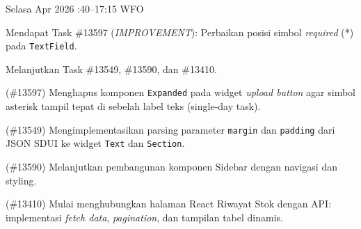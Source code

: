 \begin{logtable}
    {
        Selasa  Apr 2026 :40--17:15 \linebreak %
        WFO
    }{
        \begin{loglist}
            \item Mendapat Task \#13597 (\textit{IMPROVEMENT}): Perbaikan posisi simbol
            \textit{required} (*) pada \texttt{TextField}.
            \item Melanjutkan Task \#13549, \#13590, dan \#13410.
        \end{loglist}
    }{
        \begin{logwork}
            \item (\#13597) Menghapus komponen \texttt{Expanded} pada widget \textit{upload button} agar simbol asterisk tampil tepat di sebelah label teks (single-day task).
            \item (\#13549) Mengimplementasikan parsing parameter \texttt{margin} dan \texttt{padding} dari JSON SDUI ke widget \texttt{Text} dan \texttt{Section}.
            \item (\#13590) Melanjutkan pembangunan komponen Sidebar dengan navigasi dan styling.
            \item (\#13410) Mulai menghubungkan halaman React Riwayat Stok dengan API: implementasi \textit{fetch data}, \textit{pagination}, dan tampilan tabel dinamis.
        \end{logwork}
    }


\end{logtable}
